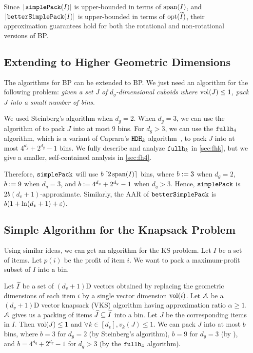 Since $|\simplePack(I)|$ is upper-bounded in terms of $\Span(I)$,
and $|\betterSimplePack(I)|$ is upper-bounded in terms of $\opt(\Itild)$,
their approximation guarantees hold for both the
rotational and non-rotational versions of  BP.

\subsection{Extending to Higher Geometric Dimensions}

The algorithms for  BP can be extended to  BP.
We just need an algorithm for the following problem:
\textsl{given a set $J$ of $d_g$-dimensional cuboids where $\vol(J) \le 1$,
pack $J$ into a small number of bins.}

We used Steinberg's algorithm when $d_g = 2$.
When $d_g = 3$, we can use the algorithm of \cite[Section 2]{diedrich2008approximation}
to pack $J$ into at most 9 bins.
For $d_g > 3$, we can use the $\fhk[4]$ algorithm, which is a variant of
Caprara's $\hdhk$ algorithm~\cite{caprara2008},
to pack $J$ into at most $4^{d_g} + 2^{d_g} - 1$ bins.
We fully describe and analyze $\fhk$ in \cref{sec:fhk},
but we give a smaller, self-contained analysis in \cref{sec:fh4}.

Therefore, $\simplePack$ will use
$b\ceil{2\Span(I)}$ bins, where $b \defeq 3$ when $d_g=2$,
$b \defeq 9$ when $d_g=3$, and $b \defeq 4^{d_g}+2^{d_g}-1$ when $d_g > 3$.
Hence, $\simplePack$ is $2b(d_v+1)$-approximate.
Similarly, the AAR of $\betterSimplePack$ is $b(1 + \ln(d_v + 1) + \eps)$.

\subsection{Simple Algorithm for the Knapsack Problem}
\label{sec:simple-gvks}

Using similar ideas, we can get an algorithm for the  KS problem.
Let $I$ be a set of  items. Let $p(i)$ be the profit of item $i$.
We want to pack a maximum-profit subset of $I$ into a bin.

Let $\Itild$ be a set of $(d_v+1)$D vectors obtained by replacing the
geometric dimensions of each item $i$ by a single vector dimension $\vol(i)$.
Let $\Acal$ be a $(d_v+1)$D vector knapsack (VKS) algorithm
having approximation ratio $\alpha \ge 1$.
$\Acal$ gives us a packing of items $\Jhat \subseteq \Itild$ into a bin.
Let $J$ be the corresponding items in $I$.
Then $\vol(J) \le 1$ and $\forall k \in [d_v], v_k(J) \le 1$.
We can pack $J$ into at most $b$ bins, where $b=3$ for $d_g=2$ (by Steinberg's algorithm),
$b=9$ for $d_g=3$ (by \cite{diedrich2008approximation}),
and $b = 4^{d_g} + 2^{d_g} - 1$ for $d_g > 3$ (by the $\fhk[4]$ algorithm).

